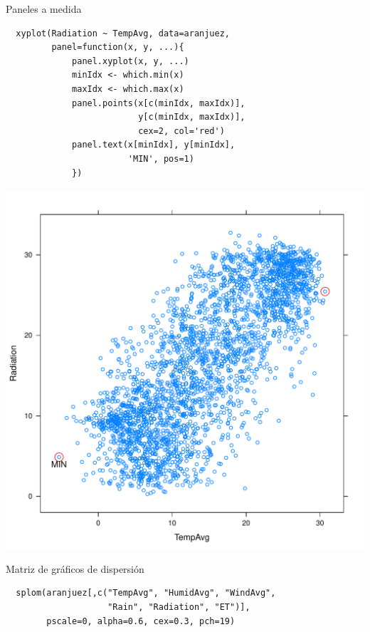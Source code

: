 \documentclass[xcolor={usenames,svgnames,dvipsnames}]{beamer}
\begin{document}
\begin{frame}[fragile,label=sec-2-1-28]{Paneles a medida}
 \lstset{language=R,label= ,caption= ,numbers=none}
\begin{lstlisting}
  xyplot(Radiation ~ TempAvg, data=aranjuez,
         panel=function(x, y, ...){
             panel.xyplot(x, y, ...)
             minIdx <- which.min(x)
             maxIdx <- which.max(x)
             panel.points(x[c(minIdx, maxIdx)],
                          y[c(minIdx, maxIdx)],
                          cex=2, col='red')
             panel.text(x[minIdx], y[minIdx],
                        'MIN', pos=1)
             })
\end{lstlisting}
\end{frame}

\begin{frame}[label=sec-2-1-29]{}
\includegraphics[width=.9\linewidth]{figs/panel.pdf}
\end{frame}

\begin{frame}[fragile,label=sec-2-1-30]{Matriz de gráficos de dispersión}
 \lstset{language=R,label= ,caption= ,numbers=none}
\begin{lstlisting}
  splom(aranjuez[,c("TempAvg", "HumidAvg", "WindAvg",
                    "Rain", "Radiation", "ET")],
        pscale=0, alpha=0.6, cex=0.3, pch=19)
\end{lstlisting}
\end{frame}
\end{document}
